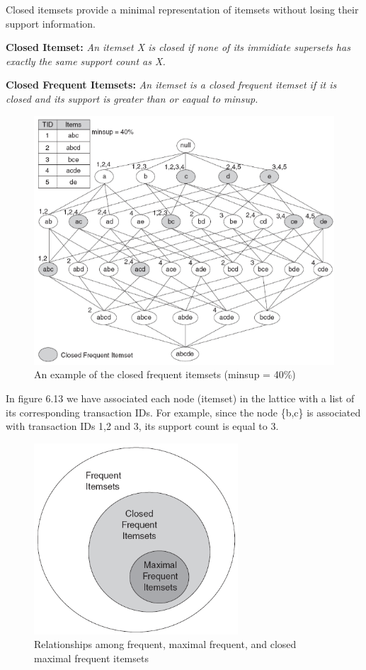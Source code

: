  			Closed itemsets provide a minimal representation of itemsets without losing
 			their support information.

 			{\bf Closed Itemset:} {\it An itemset X is closed if none of its immidiate supersets has
 			exactly the same support count as X. }

 			{\bf Closed Frequent Itemsets:} {\it An itemset is a closed frequent itemset
 			if it is closed and its support is greater than or eaqual to minsup.}
 			\begin{figure}[H]
 				\centering
 				\includegraphics[scale=0.6]{pics/closed.png}
 				\caption{An example of the closed frequent itemsets (minsup = 40\%)}
 			\end{figure}

 			In figure 6.13 we have associated each node (itemset) in the lattice with a list
 			of its corresponding transaction IDs. For example, since the node \{b,c\} is
 			associated with transaction IDs 1,2 and 3, its support count is equal to 3. 

 			\begin{figure}[H]
 				\centering
 				\includegraphics[scale=0.5]{pics/relationship.png}
 				\caption{Relationships among frequent, maximal frequent, and closed maximal frequent itemsets}
 			\end{figure}



